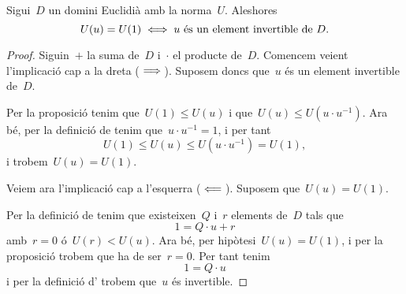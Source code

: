 \documentclass[../../main.tex]{subfiles}
\begin{document}
    \begin{proposition}
        Sigui~\(D\) un domini Euclidià amb la norma~\(U\).
        Aleshores
        \[
            U(u)=U(1)\iff u\text{ és un element invertible de }D.
        \]
        \begin{proof}
            Siguin~\(+\) la suma de~\(D\) i~\(\cdot\) el producte de~\(D\).
            Comencem veient l'implicació cap a la dreta (\(\implies\)).
            Suposem doncs que~\(u\) és un element invertible de~\(D\).

            Per la proposició  tenim que~\(U(1)\leq U(u)\) i que~\(U(u)\leq U(u\cdot u^{-1})\).
            Ara bé, per la definició de  tenim que~\(u\cdot u^{-1}=1\), i per tant
            \[
                U(1)\leq U(u)\leq U(u\cdot u^{-1})=U(1),
            \]
            i trobem~\(U(u)=U(1)\).

            Veiem ara l'implicació cap a l'esquerra (\(\impliedby\)).
            Suposem que~\(U(u)=U(1)\).

            Per la definició de  tenim que existeixen~\(Q\) i~\(r\) elements de~\(D\) tals que
            \[
                1=Q\cdot u+r
            \]
            amb~\(r=0\) ó~\(U(r)<U(u)\).
            Ara bé, per hipòtesi~\(U(u)=U(1)\), i per la proposició  trobem que ha de ser~\(r=0\).
            Per tant tenim
            \[
                1=Q\cdot u
            \]
            i per la definició d' trobem que~\(u\) és invertible.
        \end{proof}
    \end{proposition}
\end{document}

